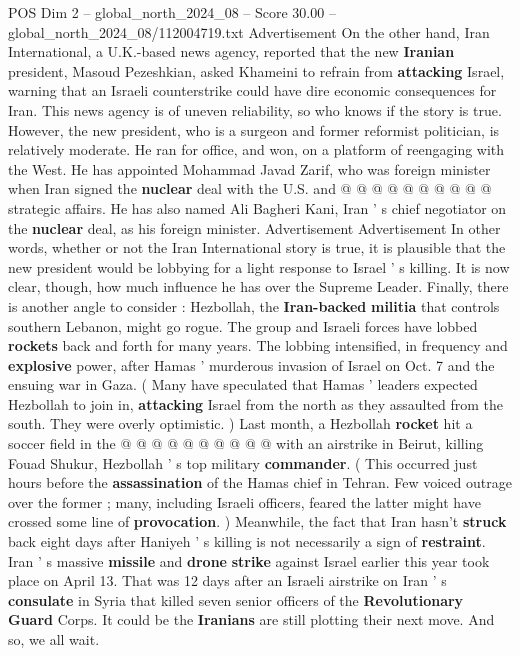\begin{textsample}{POS Dim 2 – global\_north\_2024\_08 – Score 30.00 – global\_north\_2024\_08/112004719.txt}
Advertisement On the other hand, Iran International, a U.K.-based news agency, reported that the new \textbf{Iranian} president, Masoud Pezeshkian, asked Khameini to refrain from \textbf{attacking} Israel, warning that an Israeli counterstrike could have dire economic consequences for Iran.
This news agency is of uneven reliability, so who knows if the story is true.
However, the new president, who is a surgeon and former reformist politician, is relatively moderate.
He ran for office, and won, on a platform of reengaging with the West.
He has appointed Mohammad Javad Zarif, who was foreign minister when Iran signed the \textbf{nuclear} deal with the U.S. and @ @ @ @ @ @ @ @ @ @ strategic affairs.
He has also named Ali Bagheri Kani, Iran ' s chief negotiator on the \textbf{nuclear} deal, as his foreign minister.
Advertisement Advertisement In other words, whether or not the Iran International story is true, it is plausible that the new president would be lobbying for a light response to Israel ' s killing.
It is now clear, though, how much influence he has over the Supreme Leader.
Finally, there is another angle to consider : Hezbollah, the \textbf{Iran-backed} \textbf{militia} that controls southern Lebanon, might go rogue.
The group and Israeli forces have lobbed \textbf{rockets} back and forth for many years.
The lobbing intensified, in frequency and \textbf{explosive} power, after Hamas ' murderous invasion of Israel on Oct. 7 and the ensuing war in Gaza. ( Many have speculated that Hamas ' leaders expected Hezbollah to join in, \textbf{attacking} Israel from the north as they assaulted from the south.
They were overly optimistic. ) Last month, a Hezbollah \textbf{rocket} hit a soccer field in the @ @ @ @ @ @ @ @ @ @ with an airstrike in Beirut, killing Fouad Shukur, Hezbollah ' s top military \textbf{commander}. ( This occurred just hours before the \textbf{assassination} of the Hamas chief in Tehran.
Few voiced outrage over the former ; many, including Israeli officers, feared the latter might have crossed some line of \textbf{provocation}. ) Meanwhile, the fact that Iran hasn't \textbf{struck} back eight days after Haniyeh ' s killing is not necessarily a sign of \textbf{restraint}.
Iran ' s massive \textbf{missile} and \textbf{drone} \textbf{strike} against Israel earlier this year took place on April 13.
That was 12 days after an Israeli airstrike on Iran ' s \textbf{consulate} in Syria that killed seven senior officers of the \textbf{Revolutionary} \textbf{Guard} Corps.
It could be the \textbf{Iranians} are still plotting their next move.
And so, we all wait.

\end{textsample}
